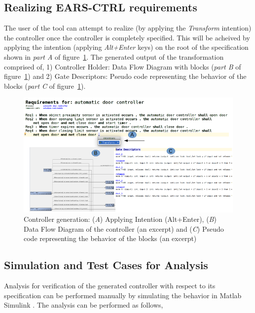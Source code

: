\subsection{Realizing \textsf{EARS-CTRL} requirements}
The user of the tool can attempt to realize (by applying the \emph{Transform} intention) the controller
once the controller is completely specified. This will be acheived by applying
the intention (applying \emph{Alt+Enter} keys) on
the root of the specification shown in \emph{part A} of
figure~\ref{fig:Spec_transform}. The generated output of the transformation
comprised of, 1) Controller Holder: Data Flow Diagram with blocks (\emph{part B}
of figure~\ref{fig:Spec_transform}) and 2) Gate Descriptors:
Pseudo code representing the behavior of the blocks (\emph{part C} of
figure~\ref{fig:Spec_transform}).
\begin{figure}[!h]
\centering
\includegraphics[width=1\textwidth]{./images/Spec_Transform.png}
\caption{Controller generation: (\emph{A}) Applying Intention (Alt+Enter),
(\emph{B}) Data Flow Diagram of the controller (an excerpt) and (\emph{C})
Pseudo code representing the behavior of the blocks (an excerpt)}
\label{fig:Spec_transform}
\end{figure}
\vspace{-1.2cm}
\subsection{Simulation and Test Cases for Analysis} Analysis for
verification of the generated controller with respect to its specification can be performed manually by simulating the behavior in Matlab
Simulink \cite{MatlabSimulink}. The analysis can be performed as follows,
